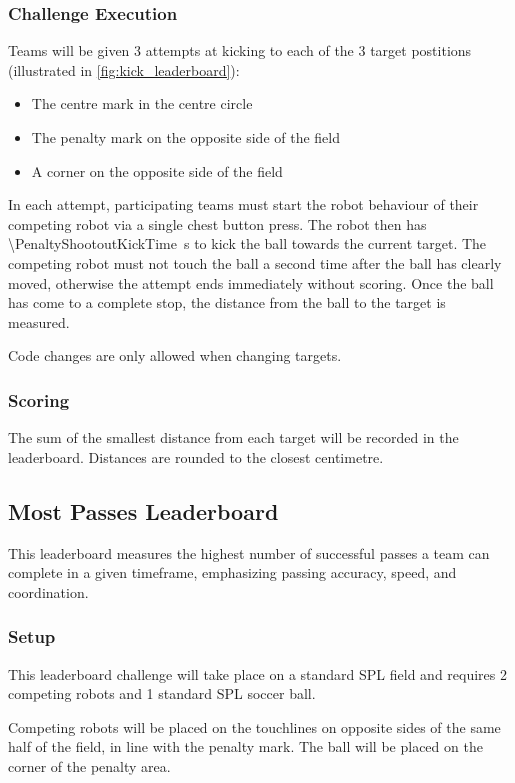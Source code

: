\subsubsection{Challenge Execution}
Teams will be given 3 attempts at kicking to each of the 3 target postitions (illustrated in \cref{fig:kick_leaderboard}):
\begin{itemize}
    \item The centre mark in the centre circle
    \item The penalty mark on the opposite side of the field
    \item A corner on the opposite side of the field
\end{itemize}
In each attempt, participating teams must start the robot behaviour of their competing robot via a single chest button
press. The robot then has \qty{\PenaltyShootoutKickTime}{\second} to kick the ball towards the current target.
The competing robot must not touch the ball a second time after the ball has clearly moved,
otherwise the attempt ends immediately without scoring.
Once the ball has come to a complete stop, the distance from the ball to the target is measured.

Code changes are only allowed when changing targets.
\subsubsection{Scoring}
The sum of the smallest distance from each target will be recorded in the leaderboard.
Distances are rounded to the closest centimetre.

\subsection{Most Passes Leaderboard}
This leaderboard measures the highest number of successful passes a team can
complete in a given timeframe, emphasizing passing accuracy, speed, and coordination.

\subsubsection{Setup}
This leaderboard challenge will take place on a standard SPL field and requires 2 competing robots
and 1 standard SPL soccer ball.

Competing robots will be placed on the touchlines on opposite sides of the same half of the field,
in line with the penalty mark. The ball will be placed on the corner of the penalty area.


